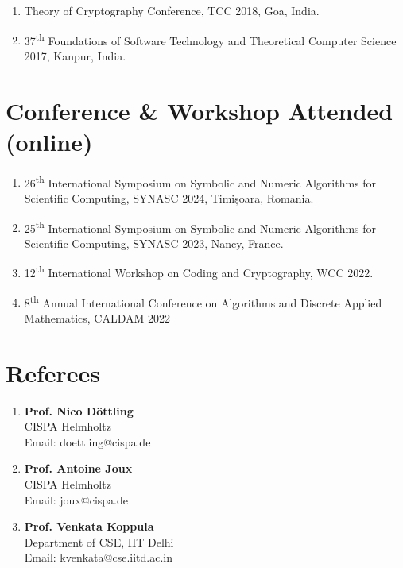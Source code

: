 \documentclass[margin]{res} %
\begin{document}
\begin{resume}
\begin{enumerate}
    \item Theory of Cryptography Conference, TCC 2018, Goa, India.
    
    \item 37\textsuperscript{th} Foundations of Software Technology and Theoretical Computer Science 2017, Kanpur, India.

\end{enumerate}

\section{Conference \& Workshop Attended (online)}
\begin{enumerate}
    \item 26\textsuperscript{th} International Symposium on Symbolic and Numeric Algorithms for Scientific Computing, SYNASC 2024, Timișoara, Romania.
    
    \item 25\textsuperscript{th} International Symposium on Symbolic and Numeric Algorithms for Scientific Computing, SYNASC 2023, Nancy, France.

    \item 12\textsuperscript{th} International Workshop on Coding and Cryptography, WCC 2022.
    
    \item 8\textsuperscript{th} Annual International Conference on Algorithms and Discrete Applied Mathematics, CALDAM 2022
\end{enumerate}

\section{Referees}
\begin{enumerate}
    \item \textbf{Prof. Nico Döttling}\\
    CISPA Helmholtz\\
    Email: doettling@cispa.de

    \item \textbf{Prof. Antoine Joux}\\
    CISPA Helmholtz\\
    Email: joux@cispa.de
    
    \item \textbf{Prof. Venkata Koppula}\\
    Department of CSE, IIT Delhi\\
    Email: kvenkata@cse.iitd.ac.in


\end{enumerate}
\end{resume}
\end{document}
